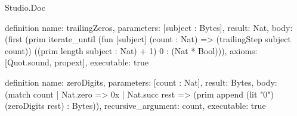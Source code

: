 \begin{lexlean}{Studio.Doc}
\begin{semanticmodule}
definition{
  name: trailingZeros,
  parameters: [subject : Bytes],
  result: Nat,
  body: (first (prim iterate_until (fun [subject] (count : Nat) => (trailingStep subject count)) ((prim length subject : Nat) + 1) 0 : (Nat * Bool))),
  axioms: [Quot.sound, propext],
  executable: true
}

definition{
  name: zeroDigits,
  parameters: [count : Nat],
  result: Bytes,
  body: (match count
    | Nat.zero => 0x
    | Nat.succ rest => (prim append (lit "0") (zeroDigits rest) : Bytes)),
  recursive_argument: count,
  executable: true
}

\end{semanticmodule}
\end{lexlean}
